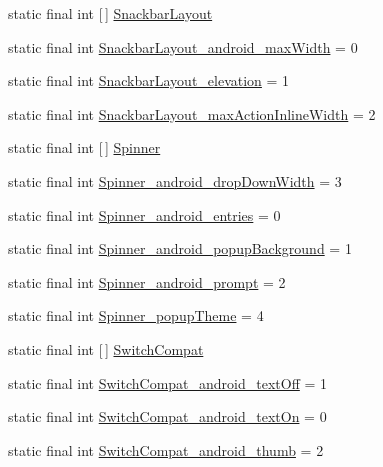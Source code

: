 \begin{DoxyCompactItemize}
\item 
static final int \mbox{[}$\,$\mbox{]} \hyperlink{classproject4_1_1xaria_1_1R_1_1styleable_ab79dc56e0952cebd4f7831958f917b48}{Snackbar\+Layout}
\item 
static final int \hyperlink{classproject4_1_1xaria_1_1R_1_1styleable_ab9a235e718272e8d3ea3f5f5d86f818a}{Snackbar\+Layout\+\_\+android\+\_\+max\+Width} = 0
\item 
static final int \hyperlink{classproject4_1_1xaria_1_1R_1_1styleable_ab22b388ecf19f24c4ad1e2f82bedc866}{Snackbar\+Layout\+\_\+elevation} = 1
\item 
static final int \hyperlink{classproject4_1_1xaria_1_1R_1_1styleable_a48e0fac8abd650e6887e336aa35757a8}{Snackbar\+Layout\+\_\+max\+Action\+Inline\+Width} = 2
\item 
static final int \mbox{[}$\,$\mbox{]} \hyperlink{classproject4_1_1xaria_1_1R_1_1styleable_ad3bf2b8838fd43ac4b50c5c40afa1039}{Spinner}
\item 
static final int \hyperlink{classproject4_1_1xaria_1_1R_1_1styleable_aac6855533bf73e07082f2ba0fc69d86c}{Spinner\+\_\+android\+\_\+drop\+Down\+Width} = 3
\item 
static final int \hyperlink{classproject4_1_1xaria_1_1R_1_1styleable_a15c697b1d47da63eeab7328fb0485ef3}{Spinner\+\_\+android\+\_\+entries} = 0
\item 
static final int \hyperlink{classproject4_1_1xaria_1_1R_1_1styleable_ac3a672ea36ed3127190795a3296ee33c}{Spinner\+\_\+android\+\_\+popup\+Background} = 1
\item 
static final int \hyperlink{classproject4_1_1xaria_1_1R_1_1styleable_a6a2f614c9012639c7b74d674247c4ef8}{Spinner\+\_\+android\+\_\+prompt} = 2
\item 
static final int \hyperlink{classproject4_1_1xaria_1_1R_1_1styleable_a1172c7cabccd79ed9194907191930ce8}{Spinner\+\_\+popup\+Theme} = 4
\item 
static final int \mbox{[}$\,$\mbox{]} \hyperlink{classproject4_1_1xaria_1_1R_1_1styleable_a15d9950df3a97e57d9c57e4c4b7e8e87}{Switch\+Compat}
\item 
static final int \hyperlink{classproject4_1_1xaria_1_1R_1_1styleable_a3f671633e0728718307fc21b5d2413c3}{Switch\+Compat\+\_\+android\+\_\+text\+Off} = 1
\item 
static final int \hyperlink{classproject4_1_1xaria_1_1R_1_1styleable_addeae4c36c168e8d419f957fd6c97234}{Switch\+Compat\+\_\+android\+\_\+text\+On} = 0
\item 
static final int \hyperlink{classproject4_1_1xaria_1_1R_1_1styleable_a022bff7fbd81db1814b1440617e056c3}{Switch\+Compat\+\_\+android\+\_\+thumb} = 2

\end{DoxyCompactItemize}

